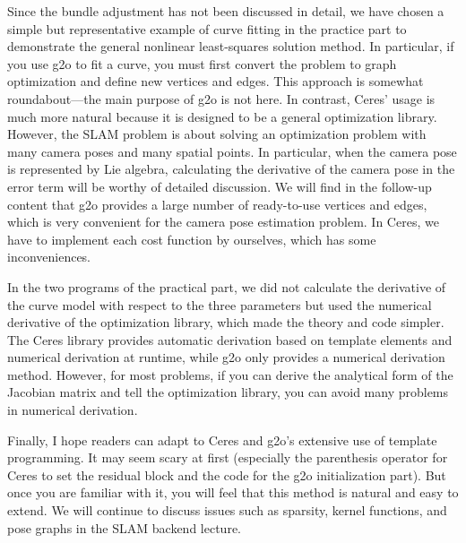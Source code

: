 Since the bundle adjustment has not been discussed in detail, we have chosen a simple but representative example of curve fitting in the practice part to demonstrate the general nonlinear least-squares solution method. In particular, if you use g2o to fit a curve, you must first convert the problem to graph optimization and define new vertices and edges. This approach is somewhat roundabout—the main purpose of g2o is not here. In contrast, Ceres' usage is much more natural because it is designed to be a general optimization library. However, the SLAM problem is about solving an optimization problem with many camera poses and many spatial points. In particular, when the camera pose is represented by Lie algebra, calculating the derivative of the camera pose in the error term will be worthy of detailed discussion. We will find in the follow-up content that g2o provides a large number of ready-to-use vertices and edges, which is very convenient for the camera pose estimation problem. In Ceres, we have to implement each cost function by ourselves, which has some inconveniences.

In the two programs of the practical part, we did not calculate the derivative of the curve model with respect to the three parameters but used the numerical derivative of the optimization library, which made the theory and code simpler. The Ceres library provides automatic derivation based on template elements and numerical derivation at runtime, while g2o only provides a numerical derivation method. However, for most problems, if you can derive the analytical form of the Jacobian matrix and tell the optimization library, you can avoid many problems in numerical derivation.

Finally, I hope readers can adapt to Ceres and g2o's extensive use of template programming. It may seem scary at first (especially the parenthesis operator for Ceres to set the residual block and the code for the g2o initialization part). But once you are familiar with it, you will feel that this method is natural and easy to extend. We will continue to discuss issues such as sparsity, kernel functions, and pose graphs in the SLAM backend lecture.

